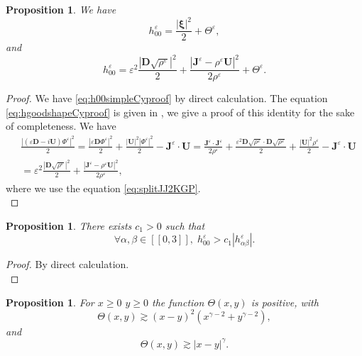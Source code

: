 \documentclass[a4paper, 15pt]{article}
\numberwithin{equation}{section}
\newtheorem{propal}[defi]{Proposition}
\begin{document}
\begin{propal}
\label{propal:waystoxiCyproof}
We have 
\begin{equation}
\label{eq:h00simpleCyproof}
    h^\varepsilon_{00}=\frac{|\boldsymbol{\xi}|^2}{2}+\Theta^\varepsilon,
\end{equation}
and 
\begin{equation}
\label{eq:hgoodshapeCyproof}
h^\varepsilon_{00}=\varepsilon^2\frac{|\textbf{D}\sqrt{\rho^\varepsilon}|^2}{2}+\frac{|\textbf{J}^\varepsilon-\rho^\varepsilon \textbf{U}|^2}{2\rho^\varepsilon}+\Theta^\varepsilon.
\end{equation}    
\end{propal}
\begin{proof}
We have \eqref{eq:h00simpleCyproof} by direct calculation. The equation \eqref{eq:hgoodshapeCyproof} is given in \cite{zbMATH06101438}, we give a proof of this identity for the sake of completeness. We have
\begin{align*}
    &\frac{|(\varepsilon\textbf{D}-i\textbf{U})\Phi^\varepsilon|^2}{2}=\frac{|\varepsilon\textbf{D}\Phi^\varepsilon|^2}{2}+\frac{|\textbf{U}|^2|\Phi^\varepsilon|^2}{2}-\textbf{J}^\varepsilon\cdot\textbf{U}=\frac{\textbf{J}^\varepsilon\cdot\textbf{J}^\varepsilon}{2\rho^\varepsilon}+\frac{\varepsilon^2\textbf{D}\sqrt{\rho^\varepsilon}\cdot\textbf{D}\sqrt{\rho^\varepsilon}}{2}+\frac{|\textbf{U}|^2\rho^\varepsilon}{2}-\textbf{J}^\varepsilon\cdot\textbf{U}\\    &=\varepsilon^2\frac{|\textbf{D}\sqrt{\rho^\varepsilon}|^2}{2}+\frac{|\textbf{J}^\varepsilon-\rho^\varepsilon \textbf{U}|^2}{2\rho^\varepsilon},
\end{align*}
where we use the equation \eqref{eq:splitJJ2KGP}. \\
\end{proof}
\begin{propal}
\label{propal:c1Cyproof}
     There exists $c_1>0$ such that 
\begin{equation}
\label{eq:c1Cyproof}
		\forall\alpha,\beta\in[\![ 0,3]\!],   \;h^\varepsilon_{00}> c_1|h^\varepsilon_{\alpha\beta}|.
\end{equation}
\end{propal}
\begin{proof}
By direct calculation.\\
\end{proof}
\begin{propal}
\label{prop:propaltheta1Cyproof}
    For $x\geq 0$ $y\geq 0$ the function $\Theta(x,y)$ is positive, with
    \begin{equation}
    \label{eq:inegtheta11Cyproof}
        \Theta(x,y)\gtrsim (x-y)^2(x^{\gamma-2}+y^{\gamma-2}),
    \end{equation}
    and 
    \begin{equation}
    \label{eq:inegtheta12Cyproof}
    \Theta(x,y)\gtrsim |x-y|^\gamma.
    \end{equation}
\end{propal}
\end{document}
